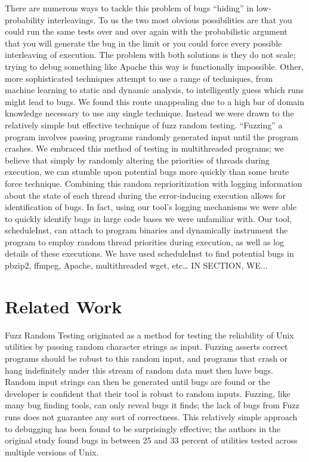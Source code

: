 \documentclass[10pt,]{article} %
\begin{document}

There are numerous ways to tackle this problem of bugs “hiding” in low-probability interleavings.
  To us the two most obvious possibilities are that you could run the same tests over and over again with the probabilistic argument that you will generate the bug in the limit or you could force every possible interleaving of execution.
  The problem with both solutions is they do not scale; trying to debug something like Apache this way is functionally impossible. 
 Other, more sophisticated techniques attempt to use a range of techniques, from machine learning to static and dynamic analysis, to intelligently guess which runs might lead to bugs. 
 We found this route unappealing due to a high bar of domain knowledge necessary to use any single technique. 
 Instead we were drawn to the relatively simple but effective technique of fuzz random testing.
  “Fuzzing” a program involves passing programs randomly generated input until the program crashes. 
 We embraced this method of testing in multithreaded programs; we believe that simply by randomly altering the priorities of threads during execution, we can stumble upon potential bugs more quickly than some brute force technique.
  Combining this random reprioritization with logging information about the state of each thread during the error-inducing execution allows for identification of bugs.
  In fact, using our tool’s logging mechanisms we were able to quickly identify bugs in large code bases we were unfamiliar with.  
Our tool, scheduleInst, can attach to program binaries and dynamically instrument the program to employ random thread priorities during execution, as well as log details of these executions.
 We have used scheduleInst to find potential bugs in pbzip2, ffmpeg, Apache, multithreaded wget, etc…  IN SECTION, WE...


\section{Related Work}


Fuzz Random Testing originated as a method for testing the reliability of Unix utilities by passing random character strings as input.  Fuzzing asserts correct programs should be robust to this random input, and programs that crash or hang indefinitely under this stream of random data must then have bugs. Random input strings can then be generated until bugs are found or the developer is confident that their tool is robust to random inputs.  Fuzzing, like many bug finding tools, can only reveal bugs it finds; the lack of bugs from Fuzz runs does not guarantee any sort of correctness.  This relatively simple approach to debugging has been found to be surprisingly effective; the authors in the original study found bugs in between 25 and 33 percent of utilities tested across multiple versions of Unix. 
\end{document}
